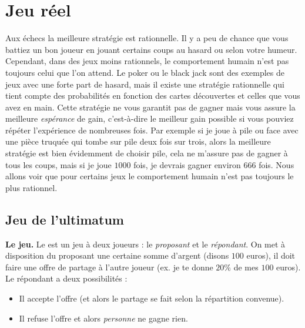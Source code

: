 \documentclass[11pt,class=report,crop=false]{standalone}
\begin{document}

%
%
%




\section{Jeu réel}

Aux échecs la meilleure stratégie est rationnelle. Il y a peu de chance que vous battiez un bon joueur en jouant certains coups au hasard ou selon votre humeur. Cependant, dans des jeux moins rationnels, le comportement humain n'est pas toujours celui que l'on attend. Le poker ou le black jack sont des exemples de jeux avec une forte part de hasard, mais il existe une stratégie rationnelle qui tient compte des probabilités en fonction des cartes découvertes et celles que vous avez en main.
Cette stratégie ne vous garantit pas de gagner mais vous assure la meilleure \emph{espérance} de gain, c'est-à-dire le meilleur gain possible si vous pouviez répéter l'expérience de nombreuses fois. Par exemple si je joue à pile ou face avec une pièce truquée qui tombe sur \og{}pile\fg{} deux fois sur trois, alors la meilleure stratégie est bien évidemment de choisir \og{}pile\fg{}, cela ne m'assure pas de gagner à tous les coups, mais si je joue $1000$ fois, je devrais gagner environ 666 fois. Nous allons voir que pour certains jeux le comportement humain n'est pas toujours le plus rationnel.

\subsection{Jeu de l'ultimatum}

\textbf{Le jeu.}
Le  est un jeu à deux joueurs : le \emph{proposant} et le \emph{répondant}. On met à disposition du proposant une certaine somme d'argent (disons $100$ euros), il doit faire une offre de partage à l'autre joueur (ex. \og{}je te donne $20\%$ de mes $100$ euros\fg{}). Le répondant a deux possibilités :
\begin{itemize}
	\item Il accepte l'offre (et alors le partage se fait selon la répartition convenue).
	\item Il refuse l'offre et alors \emph{personne} ne gagne rien.
\end{itemize}
\end{document}
